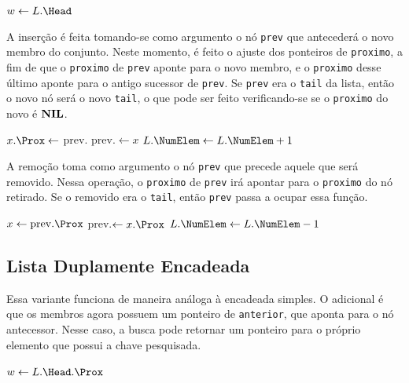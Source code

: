 \begin{function}
\SetAlgoLined
\caption{Busca-Lista($L$, $k$)}
$w \gets L.\Head$\;
\;
\end{function}

A inserção é feita tomando-se como argumento o nó \texttt{prev} que antecederá o novo
membro do conjunto.
Neste momento, é feito o ajuste dos ponteiros de \texttt{proximo}, a fim de que o
\texttt{proximo} de \texttt{prev} aponte para o novo membro, e o \texttt{proximo} desse
último aponte para o antigo sucessor de \texttt{prev}.
Se \texttt{prev} era o \texttt{tail} da lista, então o novo nó será o novo \texttt{tail},
o que pode ser feito verificando-se se o \texttt{proximo} do novo é $\mathbf{NIL}$.

\begin{function}[H]
\SetAlgoLined
\caption{Insere-Lista($L$, prev, $x$)}
$x.\Prox \gets $ prev.\Prox\;
prev.\Prox $\gets x$\;
$L.\NumElem \gets L.\NumElem + 1$\;
\end{function}

A remoção toma como argumento o nó \texttt{prev} que precede aquele que será removido.
Nessa operação, o \texttt{proximo} de \texttt{prev} irá apontar para o \texttt{proximo}
do nó retirado.
Se o removido era o \texttt{tail}, então \texttt{prev} passa a ocupar essa função.

\begin{function}[H]
\SetAlgoLined
\caption{Remove-Lista($L$, prev)}
$x \gets \mathrm{prev}.\Prox$\;
prev.\Prox $\gets x.\Prox$\;
$L.\NumElem \gets L.\NumElem - 1$\;
\end{function}

\subsection{Lista Duplamente Encadeada}

Essa variante funciona de maneira análoga à encadeada simples.
O adicional é que os membros agora possuem um ponteiro de \texttt{anterior}, que aponta
para o nó antecessor.
Nesse caso, a busca pode retornar um ponteiro para o próprio elemento que possui a chave
pesquisada.

\begin{function}
\SetAlgoLined
\caption{Busca-Lista-D($L$, $k$)}
$w \gets L.\Head.\Prox$\;
\;
\end{function}

